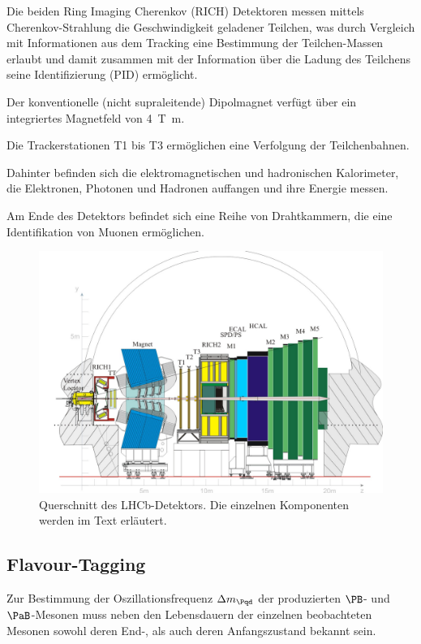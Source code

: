Die beiden Ring Imaging Cherenkov (RICH) Detektoren messen mittels Cherenkov-Strahlung die Geschwindigkeit geladener Teilchen, was durch Vergleich mit Informationen aus dem Tracking eine Bestimmung der Teilchen-Massen erlaubt und damit zusammen mit der Information über die Ladung des Teilchens seine Identifizierung (PID) ermöglicht.

Der konventionelle (nicht supraleitende) Dipolmagnet verfügt über ein integriertes Magnetfeld von \SI{4}{\tesla\metre}.

Die Trackerstationen T1 bis T3 ermöglichen eine Verfolgung der Teilchenbahnen.

Dahinter befinden sich die elektromagnetischen und hadronischen Kalorimeter, die Elektronen, Photonen und Hadronen auffangen und ihre Energie messen.

Am Ende des Detektors befindet sich eine Reihe von Drahtkammern, die eine Identifikation von Muonen ermöglichen.

\begin{figure}
  \includegraphics[width=\textwidth]{figures/lhcb.pdf}
  \caption{Querschnitt des LHCb-Detektors. Die einzelnen Komponenten werden im Text erläutert.\cite{lhcb}}
  \label{lhcb}
\end{figure}

\subsection{Flavour-Tagging}

Zur Bestimmung der Oszillationsfrequenz $\difference{m_{\Pqd}}$ der produzierten $\PB$- und $\PaB$-Mesonen muss neben den Lebensdauern der einzelnen beobachteten Mesonen sowohl deren End-, als auch deren Anfangszustand bekannt sein.

